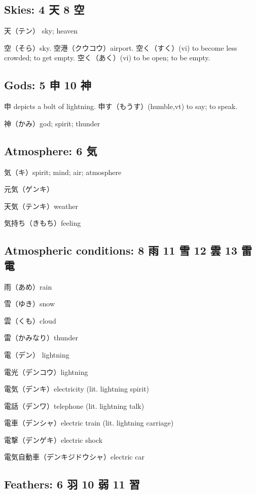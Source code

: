 \subsection{Skies: 4 天 8 空}

天（テン） sky; heaven

空（そら）sky.
空港（クウコウ）airport.
空く（すく）(vi) to become less crowded; to get empty.
空く（あく）(vi) to be open; to be empty.

\subsection{Gods: 5 申 10 神}

申 depicts a bolt of lightning.
申す（もうす）(humble,vt) to say; to speak.

神（かみ）god; spirit; thunder

\subsection{Atmosphere: 6 気}

気（キ）spirit; mind; air; atmosphere

元気（ゲンキ）

天気（テンキ）weather

気持ち（きもち）feeling

\subsection{Atmospheric conditions: 8 雨 11 雪 12 雲 13 雷電}

雨（あめ）rain

雪（ゆき）snow

雲（くも）cloud

雷（かみなり）thunder

電（デン） lightning

電光（デンコウ）lightning

電気（デンキ）electricity (lit. lightning spirit)

電話（デンワ）telephone (lit. lightning talk)

電車（デンシャ）electric train (lit. lightning carriage)

電撃（デンゲキ）electric shock

電気自動車（デンキジドウシャ）electric car

\subsection{Feathers: 6 羽 10 弱 11 習}

